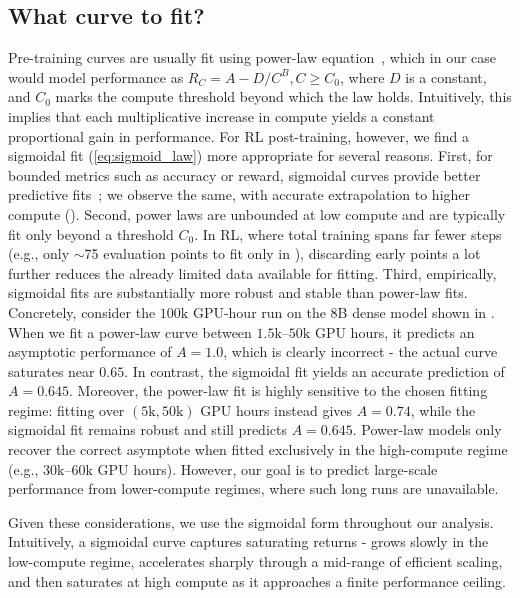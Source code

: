 \documentclass[]{fairmeta} %
\begin{document}
\subsection{What curve to fit?} \label{appendix:curve_to_fit}
Pre-training curves are usually fit using power-law equation~\citep{misfitting,kaplan2020scaling,scalingdataconstrained}, which in our case would model performance as $R_{C} = A - D/C^B, C\geq C_0$, where $D$ is a constant, and $C_0$ marks the compute threshold beyond which the law holds.
Intuitively, this implies that each multiplicative increase in compute yields a constant proportional gain in performance.
For RL post-training, however, we find a sigmoidal fit (\cref{eq:sigmoid_law}) more appropriate for several reasons.
First, for bounded metrics such as accuracy or reward, sigmoidal curves provide better predictive fits~\citep{ruan2024,srivastava2022bigbench}; we observe the same, with accurate extrapolation to higher compute ().
Second, power laws are unbounded at low compute and are typically fit only beyond a threshold $C_0$. In RL, where total training spans far fewer steps (e.g., only $\sim$75 evaluation points to fit only in ), discarding early points a lot further reduces the already limited data available for fitting.
Third, empirically, sigmoidal fits are substantially more robust and stable than power-law fits.
Concretely, consider the $100\text{k}$ GPU-hour run on the 8B dense model shown in .
When we fit a power-law curve between $1.5\text{k}$–$50\text{k}$ GPU hours, it predicts an asymptotic performance of $A = 1.0$, which is clearly incorrect - the actual curve saturates near $0.65$.
In contrast, the sigmoidal fit yields an accurate prediction of $A = 0.645$.
Moreover, the power-law fit is highly sensitive to the chosen fitting regime: fitting over $(5\text{k}, 50\text{k})$ GPU hours instead gives $A = 0.74$, while the sigmoidal fit remains robust and still predicts $A = 0.645$.
Power-law models only recover the correct asymptote when fitted exclusively in the high-compute regime (e.g., $30\text{k}$–$60\text{k}$ GPU hours).
However, our goal is to predict large-scale performance from lower-compute regimes, where such long runs are unavailable.


Given these considerations, we use the sigmoidal form throughout our analysis. Intuitively, a sigmoidal curve captures saturating returns - grows slowly in the low-compute regime, accelerates sharply through a mid-range of efficient scaling, and then saturates at high compute as it approaches a finite performance ceiling.
\end{document}
